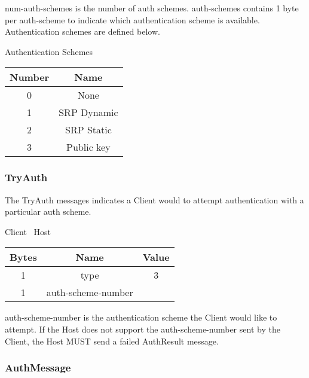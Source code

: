 num-auth-schemes is the number of auth schemes.
auth-schemes contains 1 byte per auth-scheme to indicate which authentication scheme is available.
Authentication schemes are defined below.\\

\begin{center}
    Authentication Schemes\\
    \begin{tabular}{|c|c|}
        \hline
        \textbf{Number} & \textbf{Name} \\
        \hline
        0               & None          \\
        \hline
        1               & SRP Dynamic   \\
        \hline
        2               & SRP Static    \\
        \hline
        3               & Public key    \\
        \hline
    \end{tabular}
\end{center}

\subsubsection{TryAuth}

The TryAuth messages indicates a Client would to attempt authentication with a particular auth scheme.

\begin{center}
    Client \textrightarrow\ Host\\
    \begin{tabular}{|c|c|c|}
        \hline
        \textbf{Bytes} & \textbf{Name}      & \textbf{Value} \\
        \hline
        1              & type               & 3              \\
        \hline
        1              & auth-scheme-number &                \\
        \hline
    \end{tabular}
\end{center}

auth-scheme-number is the authentication scheme the Client would like to attempt.
If the Host does not support the auth-scheme-number sent by the Client, the Host MUST send a failed AuthResult message.

\subsubsection{AuthMessage}

